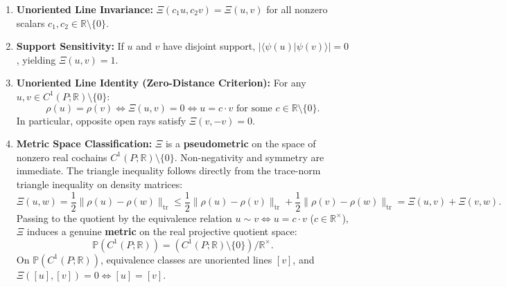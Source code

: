 \documentclass[
  10pt,
]{article}
\begin{document}
\begin{enumerate}
\def\labelenumi{\arabic{enumi}.}
\item
  \textbf{Unoriented Line Invariance:} \protect\hypertarget{math-E0143-0177}{}{\(\Xi(c_1 u, c_2 v) = \Xi(u, v)\)} for all nonzero scalars \protect\hypertarget{math-E0144-0178}{}{\(c_1, c_2 \in \mathbb{R} \setminus \{0\}\)}.
\item
  \textbf{Support Sensitivity:} If \protect\hypertarget{math-E0145-0179}{}{\(u\)} and \protect\hypertarget{math-E0053-0180}{}{\(v\)} have disjoint support, \protect\hypertarget{math-E0146-0181}{}{\(|\langle \psi(u) | \psi(v) \rangle| = 0\)}, yielding \protect\hypertarget{math-E0147-0182}{}{\(\Xi(u, v) = 1\)}.
\item
  \textbf{Unoriented Line Identity (Zero-Distance Criterion):} For any \protect\hypertarget{math-E0133-0183}{}{\(u, v \in C^1(P; \mathbb{R}) \setminus \{0\}\)}: \protect\hypertarget{math-E0148-0184}{}{\[\rho(u) = \rho(v) \iff \Xi(u, v) = 0 \iff u = c \cdot v \text{ for some } c \in \mathbb{R} \setminus \{0\}.\]} In particular, opposite open rays satisfy \protect\hypertarget{math-E0149-0185}{}{\(\Xi(v, -v) = 0\)}.
\item
  \textbf{Metric Space Classification:} \protect\hypertarget{math-E0002-0186}{}{\(\Xi\)} is a \textbf{pseudometric} on the space of nonzero real cochains \protect\hypertarget{math-E0061-0187}{}{\(C^1(P; \mathbb{R}) \setminus \{0\}\)}. Non-negativity and symmetry are immediate. The triangle inequality follows directly from the trace-norm triangle inequality on density matrices: \protect\hypertarget{math-E0150-0188}{}{\[\Xi(u, w) = \frac{1}{2} \|\rho(u) - \rho(w)\|_{\mathrm{tr}} \le \frac{1}{2} \|\rho(u) - \rho(v)\|_{\mathrm{tr}} + \frac{1}{2} \|\rho(v) - \rho(w)\|_{\mathrm{tr}} = \Xi(u, v) + \Xi(v, w).\]} Passing to the quotient by the equivalence relation \protect\hypertarget{math-E0151-0189}{}{\(u \sim v \iff u = c \cdot v\)} (\protect\hypertarget{math-E0152-0190}{}{\(c \in \mathbb{R}^\times\)}), \protect\hypertarget{math-E0002-0191}{}{\(\Xi\)} induces a genuine \textbf{metric} on the real projective quotient space: \protect\hypertarget{math-E0153-0192}{}{\[\mathbb{P}(C^1(P; \mathbb{R})) = (C^1(P; \mathbb{R}) \setminus \{0\}) / \mathbb{R}^\times.\]} On \protect\hypertarget{math-E0006-0193}{}{\(\mathbb{P}(C^1(P; \mathbb{R}))\)}, equivalence classes are unoriented lines \protect\hypertarget{math-E0154-0194}{}{\([v]\)}, and \protect\hypertarget{math-E0155-0195}{}{\(\Xi([u], [v]) = 0 \iff [u] = [v]\)}.
\end{enumerate}
\end{document}
